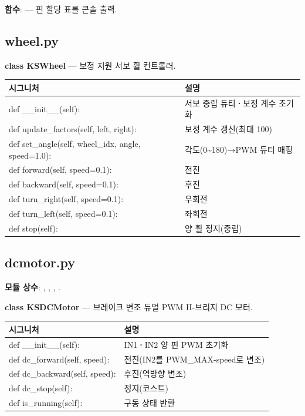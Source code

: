 \noindent\textbf{함수}:  --- 핀 할당 표를 콘솔 출력.

\subsection{wheel.py}

\noindent\textbf{class KSWheel} --- 보정 지원 서보 휠 컨트롤러.

\begin{longtable}{S{7.4cm} L{6.6cm}}
\toprule
{}\normalfont\sffamily\bfseries 시그니처 & \normalfont\sffamily\bfseries 설명 \\
\midrule
\endhead
def \_\_init\_\_(self): & 서보 중립 듀티\textbf{·}보정 계수 초기화 \\
def update\_factors(self, left, right): & 보정 계수 갱신(최대 100) \\
def set\_angle(self, wheel\_idx, angle, speed=1.0): & 각도(0\textasciitilde 180)→PWM 듀티 매핑 \\
def forward(self, speed=0.1): & 전진 \\
def backward(self, speed=0.1): & 후진 \\
def turn\_right(self, speed=0.1): & 우회전 \\
def turn\_left(self, speed=0.1): & 좌회전 \\
def stop(self): & 양 휠 정지(중립) \\
\bottomrule
\end{longtable}

\subsection{dcmotor.py}

\noindent\textbf{모듈 상수}: , ,
, .

\noindent\textbf{class KSDCMotor} --- 브레이크 변조 듀얼 PWM H-브리지 DC 모터.

\begin{longtable}{S{7.4cm} L{6.6cm}}
\toprule
{}\normalfont\sffamily\bfseries 시그니처 & \normalfont\sffamily\bfseries 설명 \\
\midrule
\endhead
def \_\_init\_\_(self): & IN1\textbf{·}IN2 양 핀 PWM 초기화 \\
def dc\_forward(self, speed): & 전진(IN2를 PWM\_MAX-speed로 변조) \\
def dc\_backward(self, speed): & 후진(역방향 변조) \\
def dc\_stop(self): & 정지(코스트) \\
def is\_running(self): & 구동 상태 반환 \\
\bottomrule
\end{longtable}

